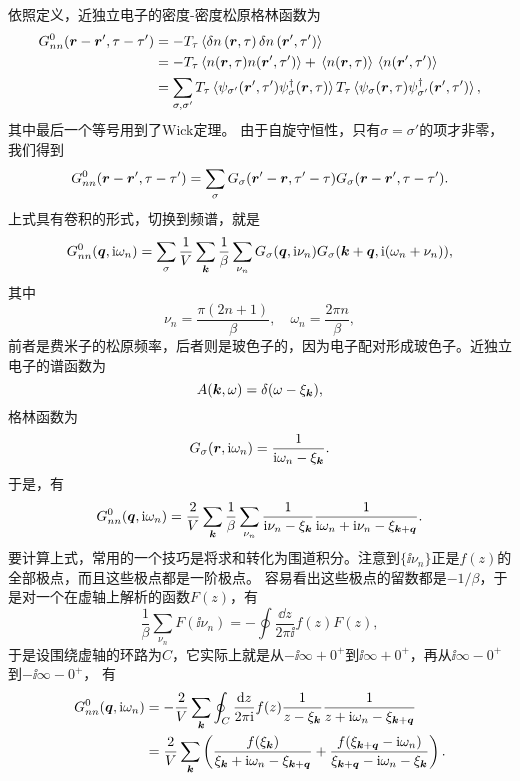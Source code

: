 依照定义，近独立电子的密度-密度松原格林函数为
\[
    \begin{aligned}
        G_{nn}^\text{0}(\vb*{r}-\vb*{r}', \tau-\tau') &= - T_\tau \expval*{\var{{n}}(\vb*{r}, \tau) \var{{n}}(\vb*{r}', \tau')} \\
        &= - T_\tau \expval*{{{n}}(\vb*{r}, \tau) {{n}}(\vb*{r}', \tau')} + \expval*{{n}(\vb*{r}, \tau)} \expval*{{n}(\vb*{r}', \tau')} \\
        &= \sum_{\sigma, \sigma'} T_\tau \expval*{{\psi}_{\sigma'}(\vb*{r}', \tau') {\psi}^\dagger_\sigma(\vb*{r}, \tau)} T_\tau \expval*{ {\psi}_\sigma(\vb*{r}, \tau) {\psi}^\dagger_{\sigma'}(\vb*{r}', \tau') } ,
    \end{aligned}
\]
其中最后一个等号用到了Wick定理。
由于自旋守恒性，只有$\sigma = \sigma'$的项才非零，我们得到
\begin{equation}
    G_{nn}^\text{0}(\vb*{r}-\vb*{r}', \tau-\tau') = \sum_\sigma G_\sigma(\vb*{r}' - \vb*{r}, \tau' - \tau) G_\sigma(\vb*{r} - \vb*{r}', \tau - \tau').
    \label{eq:relation-density-density-green-function-free-electron}
\end{equation}
上式具有卷积的形式，切换到频谱，就是
\[
    G_{nn}^\text{0}(\vb*{q}, \mathrm{i} \omega_n) = \sum_{\sigma} \frac{1}{V} \sum_{\vb*{k}} \frac{1}{\beta} \sum_{\nu_n} G_\sigma(\vb*{q}, \mathrm{i} \nu_n) G_\sigma(\vb*{k} + \vb*{q}, \mathrm{i} (\omega_n + \nu_n)),
\]
其中
\[
    \nu_n = \frac{\pi(2n+1)}{\beta}, \quad \omega_n = \frac{2\pi n}{\beta},
\]
前者是费米子的松原频率，后者则是玻色子的，因为电子配对形成玻色子。近独立电子的谱函数为
\[
    A(\vb*{k}, \omega) = \delta(\omega - \xi_{\vb*{k}}), 
\]
格林函数为
\[
    G_\sigma(\vb*{r}, \mathrm{i} \omega_n) = \frac{1}{\mathrm{i} \omega_n - \xi_{\vb*{k}}}.
\]
于是，有
\[
    G_{nn}^\text{0}(\vb*{q}, \mathrm{i} \omega_n) = \frac{2}{V} \sum_{\vb*{k}} \frac{1}{\beta} \sum_{\nu_n} \frac{1}{\mathrm{i} \nu_n - \xi_{\vb*{k}}} \frac{1}{\mathrm{i} \omega_n + \mathrm{i} \nu_n - \xi_{\vb*{k}+\vb*{q}}}.
\]
要计算上式，常用的一个技巧是将求和转化为围道积分。注意到$\{\ii \nu_n\}$正是$f(z)$的全部极点，而且这些极点都是一阶极点。
容易看出这些极点的留数都是$-1/\beta$，于是对一个在虚轴上解析的函数$F(z)$，有
\[
    \frac{1}{\beta} \sum_{\nu_n} F(\ii \nu_n) = - \oint \frac{\dd{z}}{2\pi \ii} f(z) F(z),
\]
于是设围绕虚轴的环路为$C$，它实际上就是从$-\ii \infty + 0^+$到$\ii \infty + 0^+$，再从$\ii \infty - 0^+$到$-\ii \infty - 0^+$，
有
\[
    \begin{aligned}
        G_{nn}^\text{0}(\vb*{q}, \mathrm{i} \omega_n) &= - \frac{2}{V} \sum_{\vb*{k}} \oint_C \frac{\dd{z}}{2\pi \mathrm{i}} f(z) \frac{1}{z - \xi_{\vb*{k}}} \frac{1}{z +  \mathrm{i} \omega_n - \xi_{\vb*{k}+\vb*{q}}} \\
        &= \frac{2}{V} \sum_{\vb*{k}} \left( \frac{f(\xi_{\vb*{k}})}{\xi_{\vb*{k}} + \mathrm{i} \omega_n - \xi_{\vb*{k} + \vb*{q}}} + \frac{f(\xi_{\vb*{k} + \vb*{q}} - \mathrm{i} \omega_n)}{\xi_{\vb*{k} + \vb*{q}} - \mathrm{i} \omega_n - \xi_{\vb*{k}}} \right).
    \end{aligned}
\]

